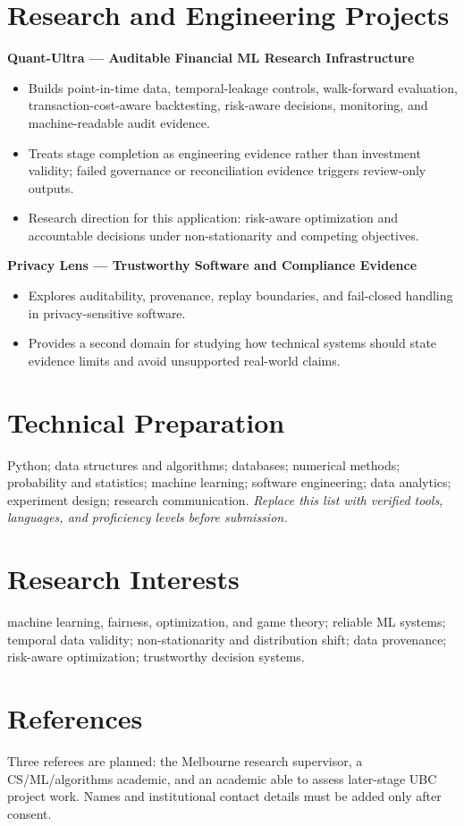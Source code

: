 \documentclass[11pt]{article}
\begin{document}
\section*{Research and Engineering Projects}
\textbf{Quant-Ultra --- Auditable Financial ML Research Infrastructure}
\begin{itemize}
\item Builds point-in-time data, temporal-leakage controls, walk-forward evaluation, transaction-cost-aware backtesting, risk-aware decisions, monitoring, and machine-readable audit evidence.
\item Treats stage completion as engineering evidence rather than investment validity; failed governance or reconciliation evidence triggers review-only outputs.
\item Research direction for this application: risk-aware optimization and accountable decisions under non-stationarity and competing objectives.
\end{itemize}

\textbf{Privacy Lens --- Trustworthy Software and Compliance Evidence}
\begin{itemize}
\item Explores auditability, provenance, replay boundaries, and fail-closed handling in privacy-sensitive software.
\item Provides a second domain for studying how technical systems should state evidence limits and avoid unsupported real-world claims.
\end{itemize}

\section*{Technical Preparation}
Python; data structures and algorithms; databases; numerical methods; probability and statistics; machine learning; software engineering; data analytics; experiment design; research communication. \textit{Replace this list with verified tools, languages, and proficiency levels before submission.}

\section*{Research Interests}
machine learning, fairness, optimization, and game theory; reliable ML systems; temporal data validity; non-stationarity and distribution shift; data provenance; risk-aware optimization; trustworthy decision systems.

\section*{References}
Three referees are planned: the Melbourne research supervisor, a CS/ML/algorithms academic, and an academic able to assess later-stage UBC project work. Names and institutional contact details must be added only after consent.
\end{document}
